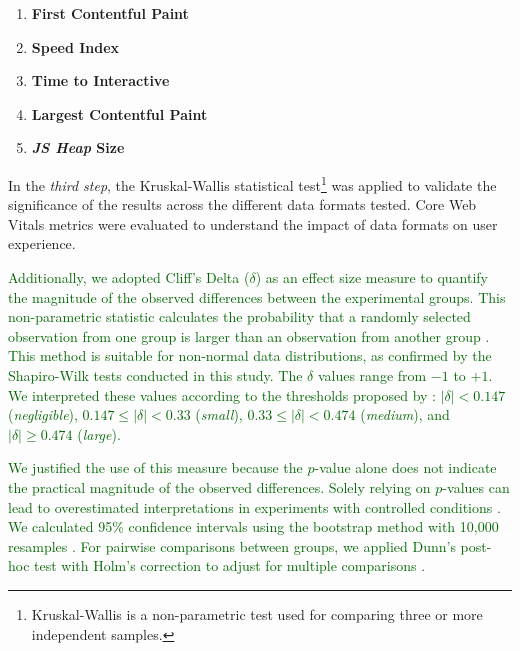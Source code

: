\documentclass{sbc2019}%
\newcommand{\joey}[1]{\textcolor{darkgreen}{#1}}
\begin{document}
\begin{enumerate}
    \item \textbf{First Contentful Paint}%
    \item \textbf{Speed Index}%
    \item \textbf{Time to Interactive}%
    \item \textbf{Largest Contentful Paint}%
    \item \textbf{\textit{JS Heap} Size}%
\end{enumerate}

In the \textit{third step}, the Kruskal-Wallis statistical test\footnote{Kruskal-Wallis is a non-parametric test used for comparing three or more independent samples.} was applied to validate the significance of the results across the different data formats tested. Core Web Vitals metrics were evaluated to understand the impact of data formats on user experience.

\joey{Additionally, we adopted Cliff's Delta ($\delta$) as an effect size measure to quantify the magnitude of the observed differences between the experimental groups. This non-parametric statistic calculates the probability that a randomly selected observation from one group is larger than an observation from another group \cite{Cliff1993}. This method is suitable for non-normal data distributions, as confirmed by the Shapiro-Wilk tests conducted in this study. The $\delta$ values range from $-1$ to $+1$. We interpreted these values according to the thresholds proposed by \citet{Romano2006}: $|\delta| < 0.147$ (\textit{negligible}), $0.147 \leq |\delta| < 0.33$ (\textit{small}), $0.33 \leq |\delta| < 0.474$ (\textit{medium}), and $|\delta| \geq 0.474$ (\textit{large}).} 

\joey{We justified the use of this measure because the $p$-value alone does not indicate the practical magnitude of the observed differences. Solely relying on $p$-values can lead to overestimated interpretations in experiments with controlled conditions \cite{Kitchenham2017, Torkar2022}. We calculated 95\% confidence intervals using the bootstrap method with 10,000 resamples \cite{efron:1994}. For pairwise comparisons between groups, we applied Dunn's post-hoc test with Holm's correction to adjust for multiple comparisons \cite{Kitchenham2024}.
}
\end{document}
